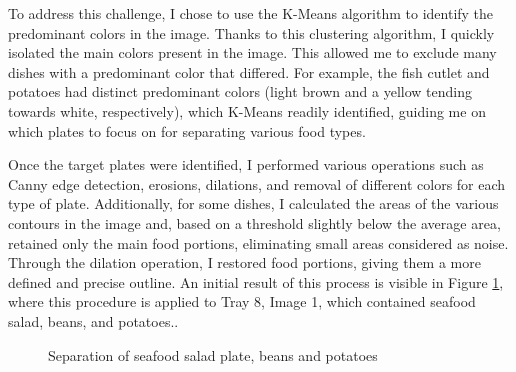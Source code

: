 \documentclass[
	a4paper, %
	10pt, %
	unnumberedsections, %
	twoside, %
]{LTJournalArticle}
\begin{document}
To address this challenge, I chose to use the K-Means algorithm to identify the predominant colors in the image. Thanks to this clustering algorithm, I quickly isolated the main colors present in the image. This allowed me to exclude many dishes with a predominant color that differed. For example, the fish cutlet and potatoes had distinct predominant colors (light brown and a yellow tending towards white, respectively), which K-Means readily identified, guiding me on which plates to focus on for separating various food types.

Once the target plates were identified, I performed various operations such as Canny edge detection, erosions, dilations, and removal of different colors for each type of plate. Additionally, for some dishes, I calculated the areas of the various contours in the image and, based on a threshold slightly below the average area, retained only the main food portions, eliminating small areas considered as noise. Through the dilation operation, I restored food portions, giving them a more defined and precise outline. An initial result of this process is visible in Figure \ref{fig:Seafood}, where this procedure is applied to Tray 8, Image 1, which contained seafood salad, beans, and potatoes..\\

\begin{figure}[t]
\centering
    \caption{Separation of seafood salad plate, beans and potatoes}
    \label{fig:Seafood}
\end{figure}
\end{document}
